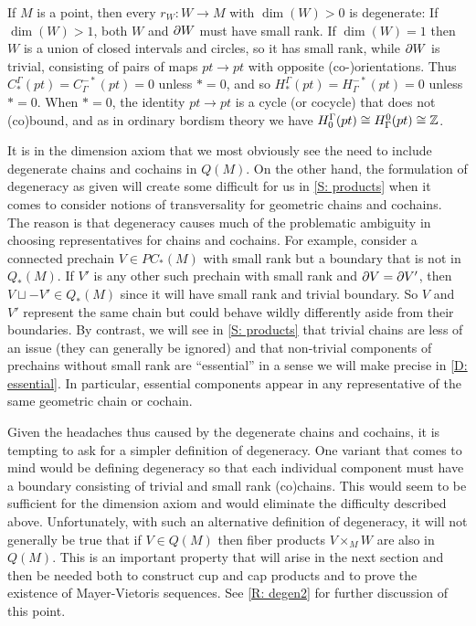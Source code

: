 \begin{example}\label{E: dimension}
	If $M$ is a point, then every $r_W \colon W \to M$ with $\dim(W)>0$ is degenerate: If $\dim(W)>1$, both $W$ and $\partial W$ must have small rank.
	If $\dim(W) = 1$ then $W$ is a union of closed intervals and circles, so it has small rank, while $\partial W$ is trivial, consisting of pairs of maps $pt \to pt$ with opposite (co\nobreakdash-)orientations.
	Thus $C_*^\Gamma(pt) = C^{-*}_\Gamma(pt) = 0$ unless $* = 0$, and so $H_*^\Gamma(pt) = H^{-*}_\Gamma(pt) = 0$ unless $* = 0$.
	When $* = 0$, the identity $pt \to pt$ is a cycle (or cocycle) that does not (co)bound, and as in ordinary bordism theory we have $H_0^\Gamma(pt) \cong H^0_\Gamma(pt) \cong \mathbb{Z}$.
\end{example}

\begin{remark}\label{R: degen1}
	It is in the dimension axiom that we most obviously see the need to include degenerate chains and cochains in $Q(M)$.
	On the other hand, the formulation of degeneracy as given will create some difficult for us in \cref{S: products} when it comes to consider notions of transversality for geometric chains and cochains.
	The reason is that degeneracy causes much of the problematic ambiguity in choosing representatives for chains and cochains.
	For example, consider a connected prechain $V \in PC_*(M)$ with small rank but a boundary that is not in $Q_*(M)$.
	If $V'$ is any other such prechain with small rank and $\partial V = \partial V'$, then $V \sqcup -V' \in Q_*(M)$ since it will have small rank and trivial boundary.
	So $V$ and $V'$ represent the same chain but could behave wildly differently aside from their boundaries.
	By contrast, we will see in \cref{S: products} that trivial chains are less of an issue (they can generally be ignored) and that non-trivial components of prechains without small rank are ``essential'' in a sense we will make precise in \cref{D: essential}.
	In particular, essential components appear in any representative of the same geometric chain or cochain.

	Given the headaches thus caused by the degenerate chains and cochains, it is tempting to ask for a simpler definition of degeneracy.
	One variant that comes to mind would be defining degeneracy so that each individual component must have a boundary consisting of trivial and small rank (co)chains.
	This would seem to be sufficient for the dimension axiom and would eliminate the difficulty described above.
	Unfortunately, with such an alternative definition of degeneracy, it will not generally be true that if $V \in Q(M)$ then fiber products $V \times_M W$ are also in $Q(M)$.
	This is an important property that will arise in the next section and then be needed both to construct cup and cap products and to prove the existence of Mayer-Vietoris sequences.
	See \cref{R: degen2} for further discussion of this point.
\end{remark}

